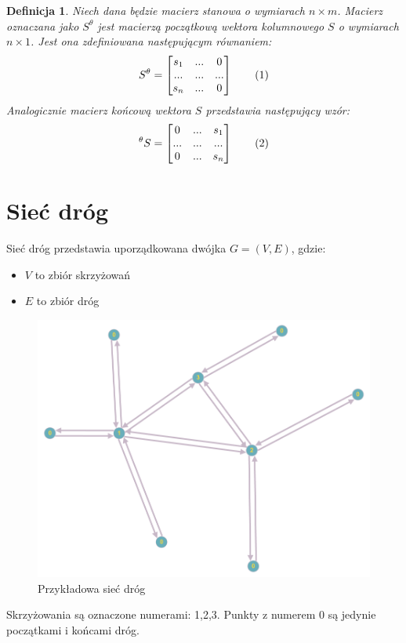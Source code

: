 \documentclass[12pt]{book}
\theoremstyle{plain}
\newtheorem{definicja}{Definicja}
\newcommand\addtag{\refstepcounter{equation}
\renewcommand{\labelenumii}{\theenumii}
\renewcommand{\theenumii}{\theenumi.\arabic{enumii}.}
\tag{\theequation}}
\begin{document}
\begin{definicja}
Niech dana będzie macierz stanowa o wymiarach $n \times m$. Macierz oznaczana jako $S^\theta$ jest macierzą początkową wektora kolumnowego $S$ o wymiarach $n \times 1$. Jest ona zdefiniowana następującym równaniem:
\[
S^\theta=\begin{bmatrix}
s_1 & ... & 0 \\
... & ... & ... \\
s_n & ... & 0 
\end{bmatrix} \addtag \label{eq:S^0}
\] 
Analogicznie macierz końcową wektora $S$ przedstawia następujący wzór:
\[
^\theta S=\begin{bmatrix}
0 & ... & s_1 \\
... & ... & ... \\
0 & ... & s_n 
\end{bmatrix} \addtag \label{eq:^0S^}
\] 
\end{definicja}
%
\section{Sieć dróg}
Sieć dróg przedstawia uporządkowana dwójka $G=(V,E)$, gdzie:
\begin{itemize}
\item $V$ to zbiór skrzyżowań
\item $E$ to zbiór dróg
\end{itemize}
\begin{minipage}{12cm}
\begin{figure}[H]
\includegraphics[width=12cm]{network}
\caption{\label{fig:network} Przykładowa sieć dróg}
\end{figure}
\end{minipage} \hfill
\begin{minipage}{5cm}
Skrzyżowania są oznaczone numerami: 1,2,3.
Punkty z numerem 0 są jedynie początkami i końcami dróg.
\end{minipage}
 \noindent
\end{document}
